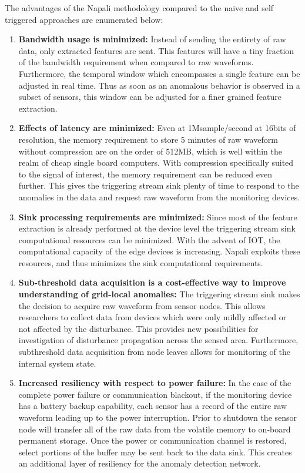 The advantages of the Napali methodology compared to the naive and self triggered approaches are enumerated below:
\begin{enumerate}
    \item \textbf{Bandwidth usage is minimized:} Instead of sending the entirety of raw data, only extracted features are sent.
    This features will have a tiny fraction of the bandwidth requirement when compared to raw waveforms.
    Furthermore, the temporal window which encompasses a single feature can be adjusted in real time.
    Thus as soon as an anomalous behavior is observed in a subset of sensors, this window can be adjusted for a finer grained feature extraction.

    \item \textbf{Effects of latency are minimized:} Even at 1Msample/second at 16bits of resolution, the memory requirement to store 5 minutes of raw waveform without compression are on the order of 512MB, which is well within the realm of cheap single board computers.
    With compression specifically suited to the signal of interest, the memory requirement can be reduced even further.
    This gives the triggering stream sink plenty of time to respond to the anomalies in the data and request raw waveform from the monitoring devices.

    \item \textbf{Sink processing requirements are minimized:} Since most of the feature extraction is already performed at the device level the triggering stream sink computational resources can be minimized.
    With the advent of IOT, the computational capacity of the edge devices is increasing.
    Napali exploits these resources, and thus minimizes the sink computational requirements.

    \item \textbf{Sub-threshold data acquisition is a cost-effective way to improve understanding of grid-local anomalies:}
    The triggering stream sink makes the decision to acquire raw waveform from sensor nodes.
    This allows researchers to collect data from devices which were only mildly affected or not affected by the disturbance.
    This provides new possibilities for investigation of disturbance propagation across the sensed area.
    Furthermore, subthreshold data acquisition from node leaves allows for monitoring of the internal system state.

    \item \textbf{Increased resiliency with respect to power failure:} In the case of the complete power failure or communication blackout, if the monitoring device has a battery backup capability, each sensor has a record of the entire raw waveform leading up to the power interruption.
    Prior to shutdown the sensor node will transfer all of the raw data from the volatile memory to on-board permanent storage.
    Once the power or communication channel is restored, select portions of the buffer may be sent back to the data sink.
    This creates an additional layer of resiliency for the anomaly detection network.


\end{enumerate}
